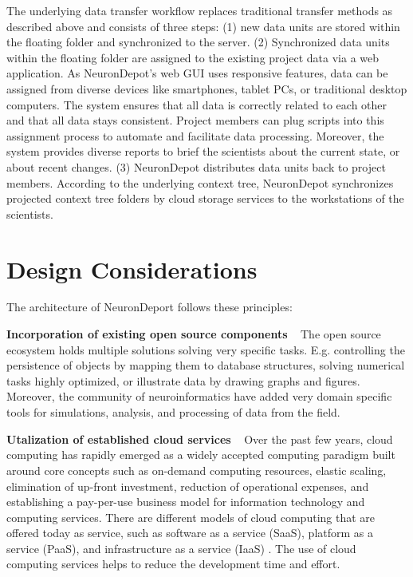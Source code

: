 \documentclass{frontiersSCNS} %
\begin{document}
The underlying data transfer workflow replaces traditional transfer methods as
described above and consists of three steps: (1) new data units are stored
within the floating folder and synchronized to the server. (2) Synchronized
data units within the floating folder are assigned to the existing project data
via a web application. As NeuronDepot's web GUI uses responsive features, data
can be assigned from diverse devices like smartphones, tablet PCs, or
traditional desktop computers. The system ensures that all data is correctly
related to each other and that all data stays consistent. Project members can
plug scripts into this assignment process to automate and facilitate data
processing. Moreover, the system provides diverse reports to brief the
scientists about the current state, or about recent changes. (3) NeuronDepot
distributes data units back to project members. According to the underlying
context tree, NeuronDepot synchronizes projected context tree folders by cloud
storage services to the workstations of the scientists.


\section{Design Considerations}
The architecture of NeuronDeport follows these principles:

\textbf{Incorporation of existing open source components} \texttt{  } The open source ecosystem holds multiple solutions solving very specific tasks.
E.g. controlling the persistence of objects by mapping them to database
structures, solving numerical tasks highly optimized, or illustrate data by
drawing graphs and figures. Moreover, the community of neuroinformatics have
added  very domain specific tools for simulations, analysis, and processing of
data from the field.

\textbf{Utalization of established cloud services} \texttt{  } Over the past
few years, cloud computing has rapidly emerged as a widely accepted computing
paradigm built around core concepts such as on-demand computing resources,
elastic scaling, elimination of up-front investment, reduction of operational
expenses, and establishing a pay-per-use business model for information
technology and computing services. There are different models of cloud
computing that are offered today as service, such as software as a service
(SaaS), platform as a service (PaaS), and infrastructure as a service (IaaS)
\citep{Mell2011, Azodolmolky2013}. The use of cloud computing services helps to
reduce the development time and effort.
\end{document}
